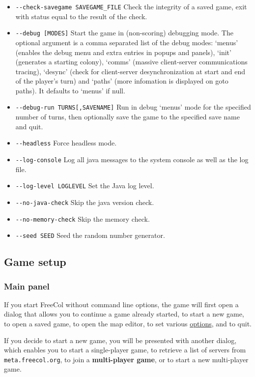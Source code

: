 \documentclass[12pt]{book}
\newcommand{\Concept}[1]{\index{#1}\hypertarget{#1}{\textbf{#1}}}
\begin{document}
\begin{itemize}
\item\verb$--check-savegame SAVEGAME_FILE$ Check the integrity of a saved game,
  exit with status equal to the result of the check.
\item\verb$--debug [MODES]$ Start the game in (non-scoring)
  debugging mode. The optional argument is a comma separated list of
  the debug modes: `menus' (enables the debug menu and extra entries
  in popups and panels), `init' (generates a starting colony), `comms'
  (massive client-server communications tracing), `desync' (check for
  client-server desynchronization at start and end of the player's
  turn) and `paths' (more infomation is displayed on goto paths). It
  defaults to `menus' if null.
\item\verb$--debug-run TURNS[,SAVENAME]$ Run in debug `menus' mode
  for the specified number of turns, then optionally save the game to
  the specified save name and quit.
\item\verb$--headless$ Force headless mode.
\item\verb$--log-console$ Log all java messages to the system console
  as well as the log file.
\item\verb$--log-level LOGLEVEL$ Set the Java log level.
\item\verb$--no-java-check$ Skip the java version check.
\item\verb$--no-memory-check$ Skip the memory check.
\item\verb$--seed SEED$ Seed the random number generator.
\end{itemize}


\hypertarget{Game setup}{\subsection{Game setup}}


\hypertarget{Main panel}{\subsubsection{Main panel}}

If you start FreeCol without command line options, the game will first
open a dialog that allows you to continue a game already started, to
start a new game, to open a saved game, to open the map editor, to set
various \hyperlink{client options} {options}, and to quit.

If you decide to start a new game, you will be presented with another
dialog, which enables you to start a single-player game, to retrieve a
list of servers from \verb$meta.freecol.org$,
to join a \Concept{multi-player game}, or to start a new multi-player
game.
\end{document}
